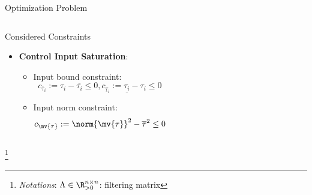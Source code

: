 \documentclass[8pt, aspectratio=169]{beamer}
\begin{document}
\begin{frame}{\insertsubsectionhead}{Optimization Problem}
\begin{columns}
\begin{block}{Considered Constraints}
\begin{itemize}
        \item \textbf{Control Input Saturation}: 
          \begin{itemize}
            \item Input bound constraint:
            \begin{equation}
              c_{\overline{\tau}_i}
              :=
              \tau_i - \overline{\tau_i}
              \le 
              0
              ,
              c_{\underline{\tau}_i}
              :=
              \underline{\tau_i} - \tau_i
              \le 
              0
            \end{equation}
            \item Input norm constraint:
            \begin{equation}
              c_{\mv{\tau}}
              :=
              \norm{\mv{\tau}}^2 - \overline{\tau}^2
              \le
              0
            \end{equation}
        \end{itemize}
      \end{itemize}
      
    \end{block}

  \end{columns}

  \let\thefootnote\relax\footnote{
    \textit{Notations}: 
    $\Lambda\in\R_{>0}^{n\times n}$: filtering matrix
  }

\end{frame}
\end{document}
